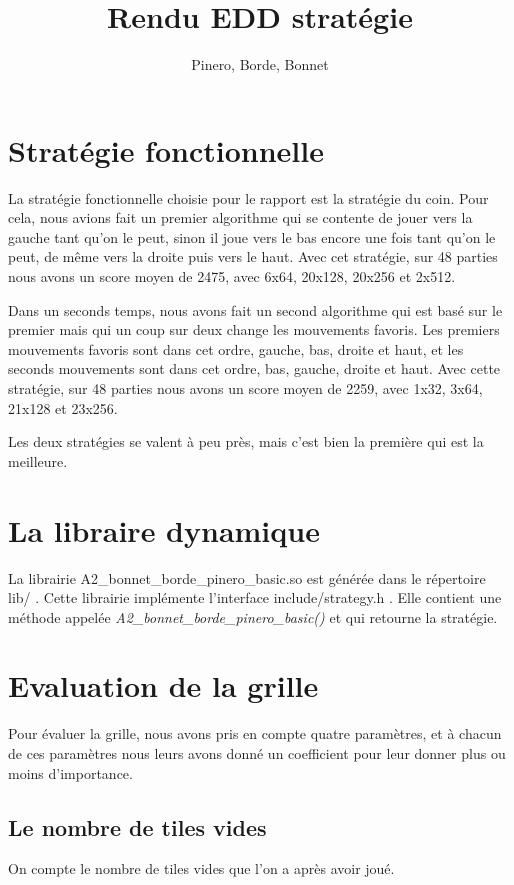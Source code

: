 \documentclass{article}
\title{Rendu EDD stratégie}
\author{Pinero, Borde, Bonnet}
\begin{document}
\maketitle
\tableofcontents

\newpage
\section{Stratégie fonctionnelle}
La stratégie fonctionnelle choisie pour le rapport est la stratégie du coin. Pour cela, nous avions fait un premier algorithme qui se contente de jouer vers la gauche tant qu'on le peut, sinon il joue vers le bas encore une fois tant qu'on le peut, de même vers la droite puis vers le haut. Avec cet stratégie, sur 48 parties nous avons un score moyen de 2475, avec 6x64, 20x128, 20x256 et 2x512.

Dans un seconds temps, nous avons fait un second algorithme qui est basé sur le premier mais qui un coup sur deux change les mouvements favoris. Les premiers mouvements favoris sont dans cet ordre, gauche, bas, droite et haut, et les seconds mouvements sont dans cet ordre, bas, gauche, droite et haut. Avec cette stratégie, sur 48 parties nous avons un score moyen de 2259, avec 1x32, 3x64, 21x128 et 23x256.

Les deux stratégies se valent à peu près, mais c'est bien la première qui est la meilleure.

\section{La libraire dynamique}
La librairie A2\_bonnet\_borde\_pinero\_basic.so est gén\'er\'ee dans le r\'epertoire \og lib/ \fg{}. Cette librairie implémente l'interface \og include/strategy.h \fg{}. Elle contient une m\'ethode appel\'ee {\itshape A2\_bonnet\_borde\_pinero\_basic()} et qui retourne la stratégie.

\clearpage
\section{Evaluation de la grille}
\label{eval_grid}
Pour évaluer la grille, nous avons pris en compte quatre paramètres, et à chacun de ces paramètres nous leurs avons donné un coefficient pour leur donner plus ou moins d'importance. 


	\subsection{Le nombre de tiles vides}
	On compte le nombre de tiles vides que l'on a après avoir joué.
\end{document}
